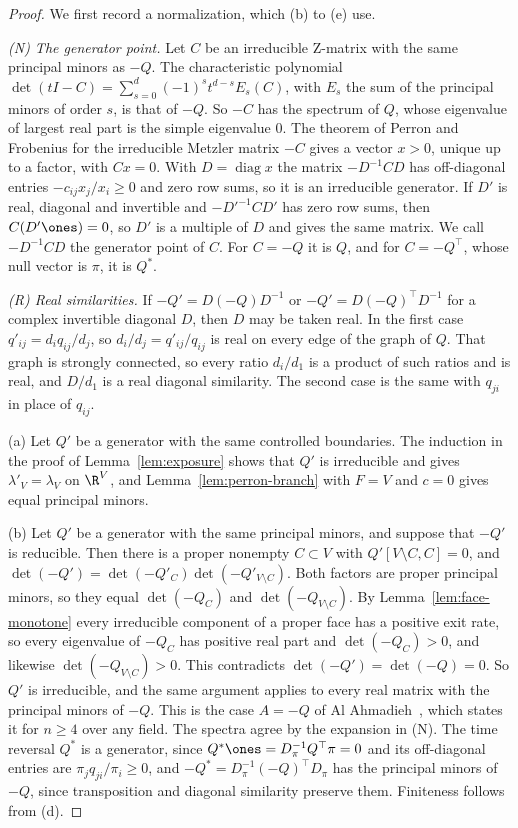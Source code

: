 \begin{proof}
We first record a normalization, which (b) to (e) use.

\emph{(N) The generator point.} Let $C$ be an irreducible Z-matrix with the
same principal minors as $-Q$. The characteristic polynomial
$\det(tI-C)=\sum_{s=0}^d(-1)^st^{d-s}E_s(C)$, with $E_s$ the sum of the principal
minors of order $s$, is that of $-Q$. So $-C$ has the spectrum of $Q$, whose
eigenvalue of largest real part is the simple eigenvalue $0$. The theorem of
Perron and Frobenius for the irreducible Metzler matrix $-C$ gives a vector
$x>0$, unique up to a factor, with $Cx=0$. With $D=\operatorname{diag}x$ the
matrix $-D^{-1}CD$ has off-diagonal entries $-c_{ij}x_j/x_i\ge0$ and zero row
sums, so it is an irreducible generator. If $D'$ is real, diagonal and
invertible and $-D'^{-1}CD'$ has zero row sums, then $C(D'\ones)=0$, so $D'$ is a
multiple of $D$ and gives the same matrix. We call $-D^{-1}CD$ the generator
point of $C$. For $C=-Q$ it is $Q$, and for $C=-Q^\top$, whose null vector is
$\pi$, it is $Q^*$.

\emph{(R) Real similarities.} If $-Q'=D(-Q)D^{-1}$ or $-Q'=D(-Q)^\top D^{-1}$ for
a complex invertible diagonal $D$, then $D$ may be taken real. In the first case
$q'_{ij}=d_iq_{ij}/d_j$, so $d_i/d_j=q'_{ij}/q_{ij}$ is real on every edge of the
graph of $Q$. That graph is strongly connected, so every ratio $d_i/d_1$ is a
product of such ratios and is real, and $D/d_1$ is a real diagonal similarity.
The second case is the same with $q_{ji}$ in place of $q_{ij}$.

(a) Let $Q'$ be a generator with the same controlled boundaries. The induction
in the proof of Lemma~\ref{lem:exposure} shows that $Q'$ is irreducible and gives
$\lambda'_V=\lambda_V$ on $\R^V$, and Lemma~\ref{lem:perron-branch} with $F=V$ and
$c=0$ gives equal principal minors.

(b) Let $Q'$ be a generator with the same principal minors, and suppose that
$-Q'$ is reducible. Then there is a proper nonempty $C\subset V$ with
$Q'[V\setminus C,C]=0$, and $\det(-Q')=\det(-Q'_C)\det(-Q'_{V\setminus C})$. Both
factors are proper principal minors, so they equal $\det(-Q_C)$ and
$\det(-Q_{V\setminus C})$. By Lemma~\ref{lem:face-monotone} every irreducible
component of a proper face has a positive exit rate, so every eigenvalue of
$-Q_C$ has positive real part and $\det(-Q_C)>0$, and likewise
$\det(-Q_{V\setminus C})>0$. This contradicts $\det(-Q')=\det(-Q)=0$. So $Q'$ is
irreducible, and the same argument applies to every real matrix with the
principal minors of $-Q$. This is the case $A=-Q$ of Al
Ahmadieh~\cite[Corollary~5.6]{alahmadieh2023}, which states it for $n\ge4$ over
any field. The spectra agree by the expansion in (N). The time
reversal $Q^*$ is a generator, since $Q^*\ones=D_\pi^{-1}Q^\top\pi=0$ and its
off-diagonal entries are $\pi_jq_{ji}/\pi_i\ge0$, and
$-Q^*=D_\pi^{-1}(-Q)^\top D_\pi$ has the principal minors of $-Q$, since
transposition and diagonal similarity preserve them. Finiteness follows from (d).


\end{proof}
